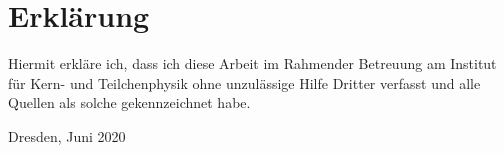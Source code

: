 \thispagestyle{empty}
\section*{Erklärung}

Hiermit erkläre ich, dass ich diese Arbeit im Rahmender Betreuung am
Institut für Kern- und Teilchenphysik ohne unzulässige Hilfe Dritter
verfasst und alle Quellen als solche gekennzeichnet habe.

\vfill

{
  \makeatletter
  \@author
  \makeatother
}

Dresden, Juni 2020

